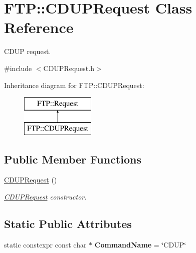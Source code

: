 \hypertarget{classFTP_1_1CDUPRequest}{}\section{F\+T\+P\+:\+:C\+D\+U\+P\+Request Class Reference}
\label{classFTP_1_1CDUPRequest}


C\+D\+U\+P request.  




{\ttfamily \#include $<$C\+D\+U\+P\+Request.\+h$>$}

Inheritance diagram for F\+T\+P\+:\+:C\+D\+U\+P\+Request\+:\begin{figure}[H]
\begin{center}
\leavevmode
\includegraphics[height=2.000000cm]{classFTP_1_1CDUPRequest}
\end{center}
\end{figure}
\subsection*{Public Member Functions}
\begin{DoxyCompactItemize}
\item 
\hypertarget{classFTP_1_1CDUPRequest_ab15198847bffc2563c46b9ff0b6dd58f}{}\hyperlink{classFTP_1_1CDUPRequest_ab15198847bffc2563c46b9ff0b6dd58f}{C\+D\+U\+P\+Request} ()\label{classFTP_1_1CDUPRequest_ab15198847bffc2563c46b9ff0b6dd58f}

\begin{DoxyCompactList}\small\item\em \hyperlink{classFTP_1_1CDUPRequest}{C\+D\+U\+P\+Request} constructor. \end{DoxyCompactList}\end{DoxyCompactItemize}
\subsection*{Static Public Attributes}
\begin{DoxyCompactItemize}
\item 
\hypertarget{classFTP_1_1CDUPRequest_a3acde3ab0a847af43a10420065dcd535}{}static constexpr const char $\ast$ {\bfseries Command\+Name} = \char`\"{}C\+D\+U\+P\char`\"{}\label{classFTP_1_1CDUPRequest_a3acde3ab0a847af43a10420065dcd535}

\end{DoxyCompactItemize}


